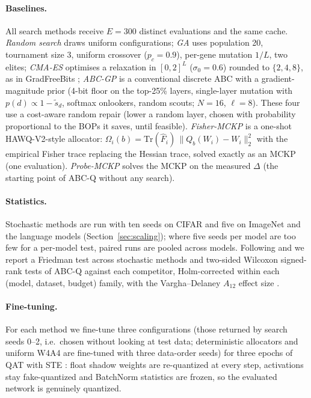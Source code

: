 \documentclass[11pt,a4paper]{article}
\begin{document}
\paragraph{Baselines.} All search methods receive $E=300$ distinct evaluations and the same cache.
\emph{Random search} draws uniform configurations; \emph{GA} \citep{Goldberg1989} uses population 20,
tournament size 3, uniform crossover ($p_c=0.9$), per-gene mutation $1/L$, two elites;
\emph{CMA-ES} \citep{Hansen2001CMA,Hansen2016Tutorial} optimises a relaxation in $[0,2]^L$
($\sigma_0=0.6$) rounded to $\{2,4,8\}$, as in GradFreeBits \citep{Bodner2022GradFreeBits};
\emph{ABC-GP} is a conventional discrete ABC with a gradient-magnitude prior (4-bit floor on the top-25\% layers,
single-layer mutation with $p(d)\propto1-\tilde s_d$, softmax onlookers, random scouts; $N=16$,
$\ell=8$). These four use a cost-aware random repair (lower a random layer, chosen with probability
proportional to the BOPs it saves, until feasible). \emph{Fisher-MCKP} is a one-shot HAWQ-V2-style
allocator: $\Omega_i(b)=\mathrm{Tr}(\hat F_i)\,\|Q_b(W_i)-W_i\|_2^2$ with the empirical Fisher
trace replacing the Hessian trace, solved exactly as an MCKP (one evaluation). \emph{Probe-MCKP} solves
the MCKP on the measured $\Delta$ (the starting point of ABC-Q without any search).

\paragraph{Statistics.} Stochastic methods are run with ten seeds on CIFAR and five on ImageNet and the
language models (Section~\ref{sec:scaling}); where five seeds per model are too few for a per-model
test, paired runs are pooled across models. Following
\citet{Derrac2011} and \citet{Demsar2006} we report a Friedman test across stochastic methods and
two-sided Wilcoxon signed-rank tests of ABC-Q against each competitor, Holm-corrected
\citep{Holm1979} within each (model, dataset, budget) family, with the Vargha--Delaney $A_{12}$ effect
size \citep{Vargha2000}.

\paragraph{Fine-tuning.} For each method we fine-tune three configurations (those returned by search
seeds 0--2, i.e.\ chosen without looking at test data; deterministic allocators and uniform W4A4 are
fine-tuned with three data-order seeds) for three epochs of QAT with STE \citep{Bengio2013STE}: float shadow weights are re-quantized at
every step, activations stay fake-quantized and BatchNorm statistics are frozen, so the evaluated
network is genuinely quantized.
\end{document}
